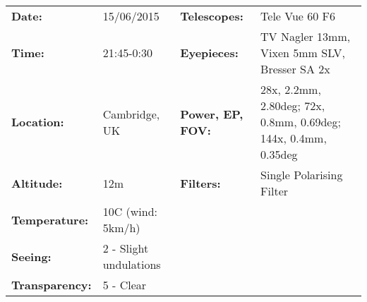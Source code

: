 \begin{tabular}{ p{0.9in} p{1.3in} p{1.2in} p{5.2in}}
{\bf Date:} & 15/06/2015 & {\bf Telescopes:} & Tele Vue 60 F6 \\ 
{\bf Time:} & 21:45-0:30 & {\bf Eyepieces:} & TV Nagler 13mm, Vixen 5mm SLV, Bresser SA 2x \\ 
{\bf Location:} & Cambridge, UK & {\bf Power, EP, FOV:} & 28x, 2.2mm, 2.80deg; 72x, 0.8mm, 0.69deg; 144x, 0.4mm, 0.35deg \\ 
{\bf Altitude:} & 12m & {\bf Filters:} & Single Polarising Filter \\ 
{\bf Temperature:} & 10C (wind: 5km/h) & & \\ 
{\bf Seeing:} & 2 - Slight undulations & & \\ 
{\bf Transparency:} & 5 - Clear & & \\ 
\end{tabular}
\centering 
